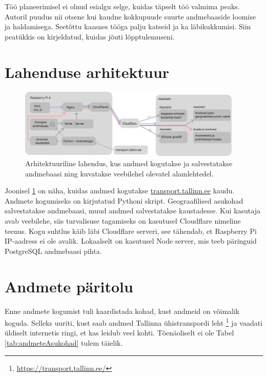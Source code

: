 
Töö planeerimisel ei olnud esialgu selge, kuidas täpselt töö valmima peaks. Autoril puudus nii otsene kui kaudne kokkupuude suurte andmebaaside loomise ja haldamisega. Seetõttu kaasnes tööga palju katseid ja ka läbikukkumisi. Siin peatükkis on kirjeldatud, kuidas jõuti lõpptulemuseni.

\section{Lahenduse arhitektuur} %
\begin{figure}[h!]
    \centering
    \includegraphics[width=0.95\textwidth]{figures/struktuur.png}
    \caption{Arhitektuuriline lahendus, kus andmed kogutakse ja salvestatakse andmebaasi ning kuvatakse veebilehel olevatel alamlehtedel.}
    \label{fig:Struktuur}
\end{figure}

Joonisel \ref{fig:Struktuur} on näha, kuidas andmed kogutakse \url{transport.tallinn.ee} kaudu. Andmete kogumiseks on kirjutatud Pythoni skript. Geograafilised asukohad salvestatakse andmebaasi, muud andmed salvestatakse kaustadesse. Kui kasutaja avab veebilehe, siis turvalisuse tagamiseks on kasutusel Cloudflare nimeline teenus. Kogu suhtlus käib läbi Cloudflare serveri, see tähendab, et Raspberry Pi  IP-aadress ei ole avalik. Lokaalselt on kasutusel Node server, mis teeb päringuid PostgreSQL andmebaasi pihta.

\section{Andmete päritolu}


Enne andmete kogumist tuli kaardistada kohad, kust andmeid on võimalik koguda. Selleks uuriti, kust saab andmed Tallinna ühistranspordi leht \footnote{\url{https://transport.tallinn.ee/}} ja vaadati üldiselt internetis ringi, et kas leidub veel kohti.
Tõenäoliselt ei ole Tabel \ref{tab:andmeteAsukohad} tulem täielik.


